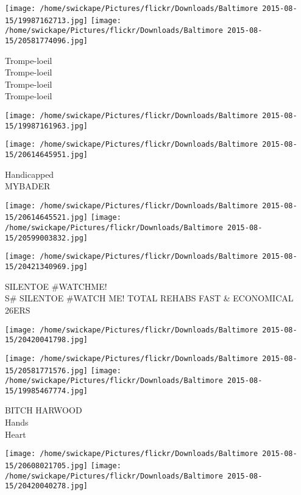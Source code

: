\documentclass[10pt,letterpaper]{article}
\begin{document}
\texttt{[image: /home/swickape/Pictures/flickr/Downloads/Baltimore 2015-08-15/19987162713.jpg]}
\texttt{[image: /home/swickape/Pictures/flickr/Downloads/Baltimore 2015-08-15/20581774096.jpg]}

Trompe{-}loeil\\
Trompe{-}loeil\\
Trompe{-}loeil\\
Trompe{-}loeil\\
\pagebreak

\texttt{[image: /home/swickape/Pictures/flickr/Downloads/Baltimore 2015-08-15/19987161963.jpg]}

\vspace{0.25in}
\texttt{[image: /home/swickape/Pictures/flickr/Downloads/Baltimore 2015-08-15/20614645951.jpg]}

Handicapped\\
MYBADER\\
\pagebreak

\texttt{[image: /home/swickape/Pictures/flickr/Downloads/Baltimore 2015-08-15/20614645521.jpg]}
\texttt{[image: /home/swickape/Pictures/flickr/Downloads/Baltimore 2015-08-15/20599003832.jpg]}

\texttt{[image: /home/swickape/Pictures/flickr/Downloads/Baltimore 2015-08-15/20421340969.jpg]}

SILENTOE \#WATCHME!\\
S\# SILENTOE \#WATCH ME! TOTAL REHABS FAST \& ECONOMICAL\\
26ERS\\
\pagebreak

\texttt{[image: /home/swickape/Pictures/flickr/Downloads/Baltimore 2015-08-15/20420041798.jpg]}

\vspace{0.25in}
\texttt{[image: /home/swickape/Pictures/flickr/Downloads/Baltimore 2015-08-15/20581771576.jpg]}
\texttt{[image: /home/swickape/Pictures/flickr/Downloads/Baltimore 2015-08-15/19985467774.jpg]}

BITCH HARWOOD\\
Hands\\
Heart\\
\pagebreak

\texttt{[image: /home/swickape/Pictures/flickr/Downloads/Baltimore 2015-08-15/20608021705.jpg]}
\texttt{[image: /home/swickape/Pictures/flickr/Downloads/Baltimore 2015-08-15/20420040278.jpg]}
\end{document}
